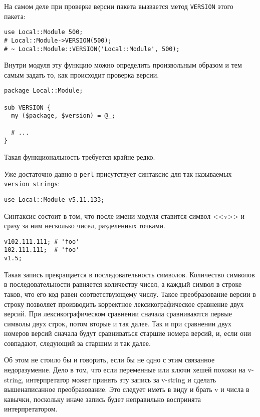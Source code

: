 На самом деле при проверке версии пакета вызвается метод \verb|VERSION| этого пакета: %
\begin{verbatim}
use Local::Module 500;
# Local::Module->VERSION(500);
# ~ Local::Module::VERSION('Local::Module', 500);
\end{verbatim}
Внутри модуля эту функцию можно определить произвольным образом и тем самым задать то, как происходит проверка версии.
\begin{verbatim}
package Local::Module;

sub VERSION {
  my ($package, $version) = @_;

  # ...
}
\end{verbatim}
Такая функциональность требуется крайне редко.

Уже достаточно давно в \verb|perl| присутствует синтаксис для так называемых \verb|version strings|:
\begin{verbatim}
use Local::Module v5.11.133;
\end{verbatim}
Синтаксис состоит в том, что после имени модуля ставится символ <<v>> и сразу за ним несколько чисел, разделенных точками.
\begin{verbatim}
v102.111.111; # 'foo'
102.111.111;  # 'foo'
v1.5;
\end{verbatim}

Такая запись превращается в последовательность символов. Количество символов в последовательности равняется количеству чисел, а каждый символ в строке таков, что его код равен соответствующему числу. Такое преобразование версии в строку позволяет производить корректное лексикографическое сравнение двух версий. При лексикографическом сравнении сначала сравниваются первые символы двух строк, потом вторые и так далее. Так и при сравнении двух номеров версий сначала будут сравниваться старшие номера версий, и, если они совпадают, следующий за старшим и так далее.

Об этом не стоило бы и говорить, если бы не одно с этим связанное недоразумение. Дело в том, что если переменные или ключи хешей похожи на v-string, интерпретатор может принять эту запись за v-string и сделать вышенаписанное преобразование. Это следует иметь в виду и брать v и числа в кавычки, поскольку иначе запись будет неправильно воспринята интерпретатором.

